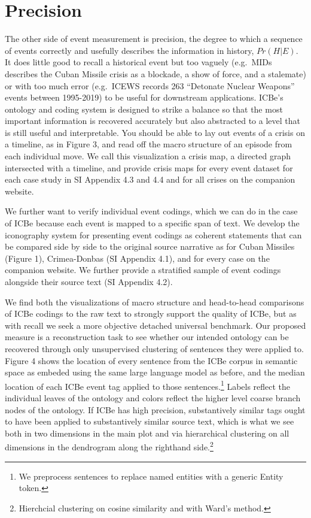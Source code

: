 \documentclass{article}
\begin{document}
\hypertarget{precision}{%
\section{Precision}\label{precision}}

The other side of event measurement is precision, the degree to which a
sequence of events correctly and usefully describes the information in
history, \(Pr(H|E)\). It does little good to recall a historical event
but too vaguely (e.g.~MIDs describes the Cuban Missile crisis as a
blockade, a show of force, and a stalemate) or with too much error
(e.g.~ICEWS records 263 ``Detonate Nuclear Weapons'' events between
1995-2019) to be useful for downstream applications. ICBe's ontology and
coding system is designed to strike a balance so that the most important
information is recovered accurately but also abstracted to a level that
is still useful and interpretable. You should be able to lay out events
of a crisis on a timeline, as in Figure 3, and read off the macro
structure of an episode from each individual move. We call this
visualization a crisis map, a directed graph intersected with a
timeline, and provide crisis maps for every event dataset for each case
study in SI Appendix 4.3 and 4.4 and for all crises on the companion
website.

We further want to verify individual event codings, which we can do in
the case of ICBe because each event is mapped to a specific span of
text. We develop the iconography system for presenting event codings as
coherent statements that can be compared side by side to the original
source narrative as for Cuban Missiles (Figure 1), Crimea-Donbas (SI
Appendix 4.1), and for every case on the companion website. We further
provide a stratified sample of event codings alongside their source text
(SI Appendix 4.2).

We find both the visualizations of macro structure and head-to-head
comparisons of ICBe codings to the raw text to strongly support the
quality of ICBe, but as with recall we seek a more objective detached
universal benchmark. Our proposed measure is a reconstruction task to
see whether our intended ontology can be recovered through only
unsupervised clustering of sentences they were applied to. Figure 4
shows the location of every sentence from the ICBe corpus in semantic
space as embeded using the same large language model as before, and the
median location of each ICBe event tag applied to those
sentences.\footnote{We preprocess sentences to replace named entities
  with a generic Entity token.} Labels reflect the individual leaves of
the ontology and colors reflect the higher level coarse branch nodes of
the ontology. If ICBe has high precision, substantively similar tags
ought to have been applied to substantively similar source text, which
is what we see both in two dimensions in the main plot and via
hierarchical clustering on all dimensions in the dendrogram along the
righthand side.\footnote{Hierchcial clustering on cosine similarity and
  with Ward's method.}
\end{document}
